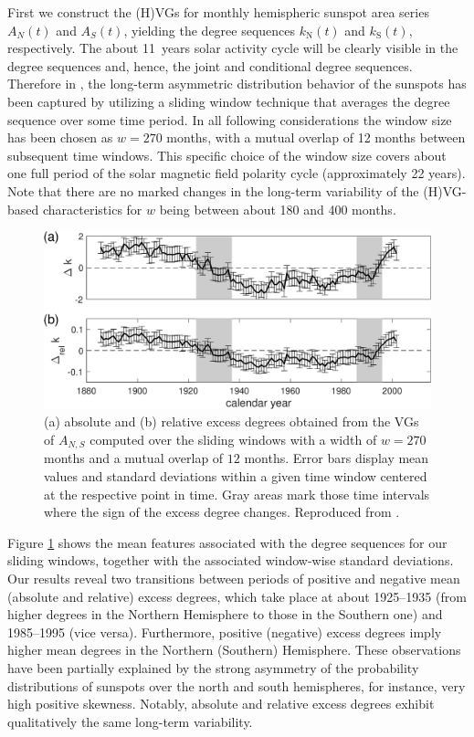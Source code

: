 		First we construct the (H)VGs for monthly hemispheric sunspot area series $A_{N}(t)$ and $A_{S}(t)$, yielding the degree sequences $k_\mathrm{N}(t)$ and $k_\mathrm{S}(t)$, respectively. The about 11~years solar activity cycle will be clearly visible in the degree sequences and, hence, the joint and conditional degree sequences. Therefore in \cite{Zou2014}, the long-term asymmetric distribution behavior of the sunspots has been captured by utilizing a sliding window technique that averages the degree sequence over some time period. In all following considerations the window size has been chosen as $w = 270$ months, with a mutual overlap of 12 months between subsequent time windows. This specific choice of the window size covers about one full period of the solar magnetic field polarity cycle (approximately 22 years). Note that there are no marked changes in the long-term variability of the (H)VG-based characteristics for $w$ being between about 180 and 400 months.
\begin{figure}
	\centering
	\includegraphics[width=0.8\columnwidth]{Chapter07_Applications/north_southDegreeComXWin130P.eps}
\caption{\small {(a) absolute and (b) relative excess degrees obtained from the VGs of $A_{N,S}$ computed over the sliding windows with a width of $w = 270$ months and a mutual overlap of $12$ months. Error bars display mean values and standard deviations within a given time window centered at the respective point in time. Gray areas mark those time intervals where the sign of the excess degree changes. Reproduced from \cite{Zou2014}. }
\label{degreeComX_ns_area270}}
\end{figure}		
Figure \ref{degreeComX_ns_area270} shows the mean features associated with the degree sequences for our sliding windows, together with the associated window-wise standard deviations. Our results reveal two transitions between periods of positive and negative mean (absolute and relative) excess degrees, which take place at about 1925--1935 (from higher degrees in the Northern Hemisphere to those in the Southern one) and 1985--1995 (vice versa). Furthermore, positive (negative) excess degrees imply higher mean degrees in the Northern (Southern) Hemisphere. These observations have been partially explained by the strong asymmetry of the probability distributions of sunspots over the north and south hemispheres, for instance, very high positive skewness. Notably, absolute and relative excess degrees exhibit qualitatively the same long-term variability. 
		
